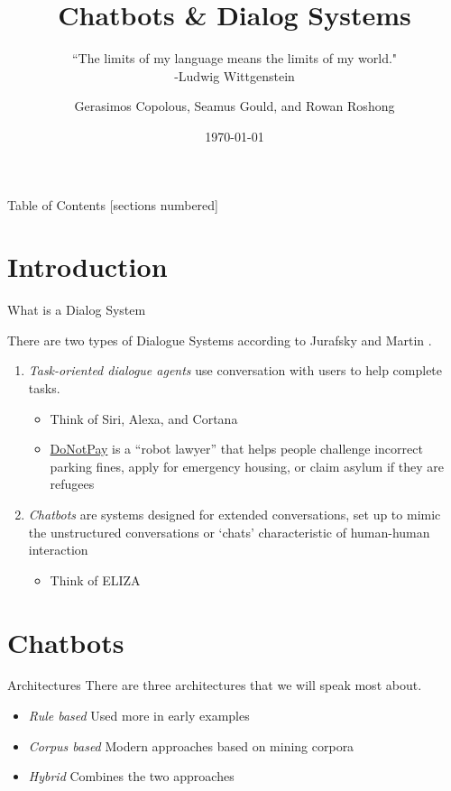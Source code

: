 \documentclass[10pt]{beamer}
\title{Chatbots \& Dialog Systems}
\subtitle{``The limits of my language means the limits of my world." \\ -Ludwig Wittgenstein}
\date{\today}
\author{Gerasimos Copolous, Seamus Gould, and Rowan Roshong}
\institute{Vassar College}
\begin{document}
\maketitle

\begin{frame}{Table of Contents}
  [sections numbered]
  \tableofcontents%
\end{frame}

\section[Introduction]{Introduction}

\begin{frame}[fragile]{What is a Dialog System\?}

There are two types of Dialogue Systems according to Jurafsky and Martin \cite{nlp}.

\begin{enumerate}
    \item \textit{Task-oriented dialogue
agents} use conversation with users to help complete tasks.
\begin{itemize}
    \item Think of Siri, Alexa, and Cortana
    \item \href{https://en.wikipedia.org/wiki/DoNotPay}{DoNotPay} is a “robot lawyer” that helps people challenge incorrect parking fines, apply for emergency housing, or claim asylum if they are refugees
\end{itemize}
\item \textit{Chatbots} are systems designed for extended conversations, set up to mimic
the unstructured conversations or ‘chats’ characteristic of human-human interaction
\begin{itemize}
    \item Think of ELIZA
\end{itemize}
\end{enumerate}
\end{frame}

\section{Chatbots}

\begin{frame}{Architectures}
There are three architectures that we will speak most about.
	\begin{itemize}
	\item \textit{Rule based} Used more in early examples
	\item \textit{Corpus based} Modern approaches based on mining corpora
	\item \textit{Hybrid} Combines the two approaches
	\end{itemize}
\end{frame}
\end{document}
